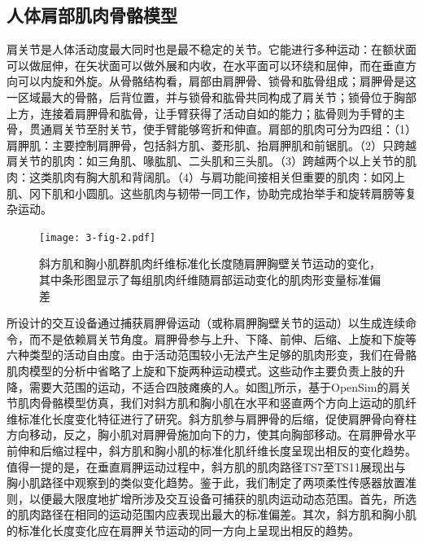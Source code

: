 \subsection{人体肩部肌肉骨骼模型}
肩关节是人体活动度最大同时也是最不稳定的关节。它能进行多种运动：在额状面可以做屈伸，在矢状面可以做外展和内收，在水平面可以环绕和屈伸，而在垂直方向可以内旋和外旋。从骨骼结构看，肩部由肩胛骨、锁骨和肱骨组成；肩胛骨是这一区域最大的骨骼，后背位置，并与锁骨和肱骨共同构成了肩关节；锁骨位于胸部上方，连接着肩胛骨和肱骨，让手臂获得了活动自如的能力；肱骨则为手臂的主骨，贯通肩关节至肘关节，使手臂能够弯折和伸直。肩部的肌肉可分为四组：（1）肩胛肌：主要控制肩胛骨，包括斜方肌、菱形肌、抬肩胛肌和前锯肌。（2）只跨越肩关节的肌肉：如三角肌、喙肱肌、二头肌和三头肌。（3）跨越两个以上关节的肌肉：这类肌肉有胸大肌和背阔肌。（4）与肩功能间接相关但重要的肌肉：如冈上肌、冈下肌和小圆肌。这些肌肉与韧带一同工作，协助完成抬举手和旋转肩膀等复杂运动\cite{terryFunctionalAnatomyShoulder2000}。

\begin{figure}[htb]
    \centering
    \texttt{[image: 3-fig-2.pdf]}
    \caption{斜方肌和胸小肌群肌肉纤维标准化长度随肩胛胸壁关节运动的变化，其中条形图显示了每组肌肉纤维随肩部运动变化的肌肉形变量标准偏差}
    \label{3-fig-2}
\end{figure}   
所设计的交互设备通过捕获肩胛骨运动（或称肩胛胸壁关节的运动）以生成连续命令，而不是依赖肩关节角度。肩胛骨参与上升、下降、前伸、后缩、上旋和下旋等六种类型的活动自由度。由于活动范围较小无法产生足够的肌肉形变，我们在骨骼肌肉模型的分析中省略了上旋和下旋两种运动模式。这些动作主要负责上肢的升降，需要大范围的运动，不适合四肢瘫痪的人。如图\ref*{3-fig-2}所示，基于OpenSim\cite{chadwickRealTimeSimulationThreeDimensional2014}的肩关节肌肉骨骼模型仿真，我们对斜方肌和胸小肌在水平和竖直两个方向上运动的肌纤维标准化长度变化特征进行了研究。斜方肌参与肩胛骨的后缩，促使肩胛骨向脊柱方向移动，反之，胸小肌对肩胛骨施加向下的力，使其向胸部移动。在肩胛骨水平前伸和后缩过程中，斜方肌和胸小肌的标准化肌纤维长度呈现出相反的变化趋势。值得一提的是，在垂直肩胛运动过程中，斜方肌的肌肉路径TS7至TS11展现出与胸小肌路径中观察到的类似变化趋势。鉴于此，我们制定了两项柔性传感器放置准则，以便最大限度地扩增所涉及交互设备可捕获的肌肉运动动态范围。首先，所选的肌肉路径在相同的运动范围内应表现出最大的标准偏差。其次，斜方肌和胸小肌的标准化长度变化应在肩胛关节运动的同一方向上呈现出相反的趋势。

